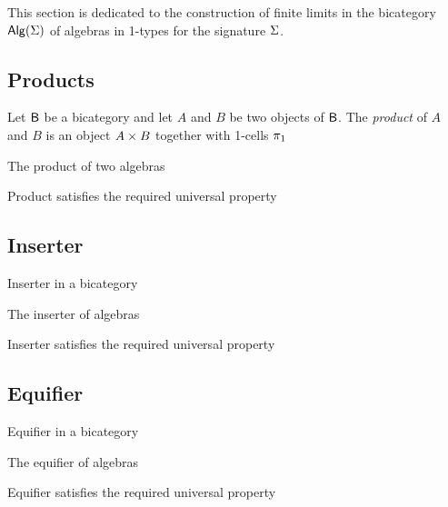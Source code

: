 This section is dedicated to the construction of finite limits in the
bicategory $\mathsf{Alg}(\Sigma)$ of algebras in 1-types for the signature $\Sigma$.

\subsection{Products}

\begin{definition}
Let $\mathsf{B}$ be a bicategory and let $A$ and $B$ be two objects of $\mathsf{B}$. The \emph{product} of $A$ and $B$ is an object $A \times B$ together with 1-cells $\pi_1$
\end{definition} 

\begin{definition}
The product of two algebras
\end{definition}

\begin{proposition}
Product satisfies the required universal property
\end{proposition}

\subsection{Inserter}

\begin{definition}
Inserter in a bicategory
\end{definition}

\begin{definition}
The inserter of algebras
\end{definition}

\begin{proposition}
Inserter satisfies the required universal property
\end{proposition}

\subsection{Equifier}

\begin{definition}
Equifier in a bicategory
\end{definition}

\begin{definition}
The equifier of algebras
\end{definition}

\begin{proposition}
Equifier satisfies the required universal property
\end{proposition}
